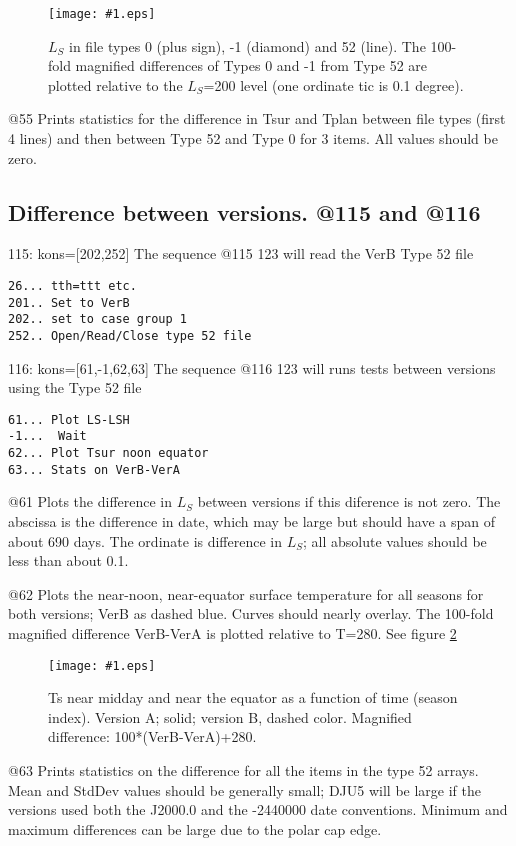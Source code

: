 \documentclass{article}  %
\newcommand{\igc}[1]{\texttt{[image: \#1.eps]}}
\begin{document}
\begin{figure}[!ht] \igc{p53}
\caption[Diurnal Mean Ts] {$L_S$ in file types 0 (plus sign), -1 (diamond) and 52 (line).  The 100-fold magnified differences of Types 0 and -1 from Type 52  are plotted relative to the $L_S$=200 level (one ordinate tic is 0.1 degree).
\label{p53} } \end{figure}


@55 Prints statistics for the difference in Tsur and Tplan between file types (first 4 lines) and then between Type 52 and Type 0 for 3 items. All values should be zero.

\subsection{Difference between versions. @115 and @116} %
115: kons=[202,252]   The sequence @115 123 will read the VerB Type 52 file
\vspace{-3.mm} 
\begin{verbatim}
26... tth=ttt etc.
201.. Set to VerB
202.. set to case group 1
252.. Open/Read/Close type 52 file
\end{verbatim}

116: kons=[61,-1,62,63]  The sequence @116 123 will runs tests between versions using the Type 52 file
\vspace{-3.mm} 
\begin{verbatim}
61... Plot LS-LSH
-1...  Wait
62... Plot Tsur noon equator
63... Stats on VerB-VerA
\end{verbatim}
@61 Plots the difference in $L_S$ between versions if this diference is not zero. The abscissa is the difference in date, which may be large but should have a span of about 690 days. The ordinate is difference in $L_S$;  all absolute values should be less than about 0.1. 

@62 Plots the near-noon, near-equator surface temperature for all seasons for
both versions; VerB as dashed blue. Curves should nearly overlay. The 100-fold
magnified difference VerB-VerA is plotted relative to T=280. See figure
\ref{p62}

\begin{figure}[!ht] \igc{p62}
\caption[Seasonal Equator Noon] {Ts near midday and near the equator as a function of time (season index). Version A; solid; version B, dashed color. Magnified difference:  100*(VerB-VerA)+280. 
\label{p62} } \end{figure}

@63 Prints statistics on the difference for all the items in the type 52
arrays. Mean and StdDev values should be generally small; DJU5 will be large if
the versions used both the J2000.0 and the -2440000 date conventions. Minimum
and maximum differences can be large due to the polar cap edge.
\end{document}
